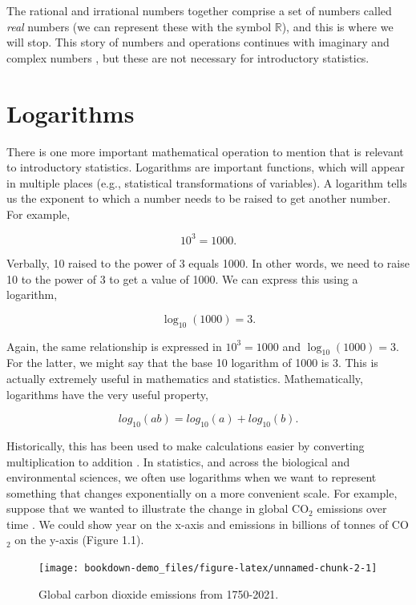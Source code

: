 \documentclass[
]{scrbook}
\begin{document}
The rational and irrational numbers together comprise a set of numbers called \emph{real} numbers (we can represent these with the symbol \(\mathbb{R}\)), and this is where we will stop.
This story of numbers and operations continues with imaginary and complex numbers \citep{Courant1996, Pastor2008}, but these are not necessary for introductory statistics.

\hypertarget{logarithms}{%
\section{Logarithms}\label{logarithms}}

There is one more important mathematical operation to mention that is relevant to introductory statistics.
Logarithms are important functions, which will appear in multiple places (e.g., statistical transformations of variables).
A logarithm tells us the exponent to which a number needs to be raised to get another number.
For example,

\[10^{3} = 1000.\]

Verbally, 10 raised to the power of 3 equals 1000.
In other words, we need to raise 10 to the power of 3 to get a value of 1000.
We can express this using a logarithm,

\[\log_{10}\left(1000\right) = 3.\]

Again, the same relationship is expressed in \(10^{3} = 1000\) and \(\log_{10}(1000) = 3\).
For the latter, we might say that the base 10 logarithm of 1000 is 3.
This is actually extremely useful in mathematics and statistics.
Mathematically, logarithms have the very useful property,

\[log_{10}(ab) = log_{10}(a) + log_{10}(b).\]

Historically, this has been used to make calculations easier by converting multiplication to addition \citep{Stewart2008}.
In statistics, and across the biological and environmental sciences, we often use logarithms when we want to represent something that changes exponentially on a more convenient scale.
For example, suppose that we wanted to illustrate the change in global CO\(_{2}\) emissions over time \citep{Friedlingstein2022}.
We could show year on the x-axis and emissions in billions of tonnes of CO\(_{2}\) on the y-axis (Figure 1.1).

\begin{figure}
\texttt{[image: bookdown-demo\_files/figure-latex/unnamed-chunk-2-1]} \caption{Global carbon dioxide emissions from 1750-2021.}\label{fig:unnamed-chunk-2}
\end{figure}
\end{document}
